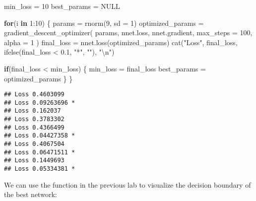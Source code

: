 \documentclass[
  a4paper,
]{article}
\newenvironment{Shaded}{\begin{snugshade}}{\end{snugshade}}
\newcommand{\AttributeTok}[1]{\textcolor[rgb]{0.77,0.63,0.00}{#1}}
\newcommand{\ConstantTok}[1]{\textcolor[rgb]{0.00,0.00,0.00}{#1}}
\newcommand{\ControlFlowTok}[1]{\textcolor[rgb]{0.13,0.29,0.53}{\textbf{#1}}}
\newcommand{\DecValTok}[1]{\textcolor[rgb]{0.00,0.00,0.81}{#1}}
\newcommand{\FloatTok}[1]{\textcolor[rgb]{0.00,0.00,0.81}{#1}}
\newcommand{\FunctionTok}[1]{\textcolor[rgb]{0.00,0.00,0.00}{#1}}
\newcommand{\NormalTok}[1]{#1}
\newcommand{\OtherTok}[1]{\textcolor[rgb]{0.56,0.35,0.01}{#1}}
\newcommand{\SpecialCharTok}[1]{\textcolor[rgb]{0.00,0.00,0.00}{#1}}
\newcommand{\StringTok}[1]{\textcolor[rgb]{0.31,0.60,0.02}{#1}}
\begin{document}
\begin{Shaded}
\begin{Highlighting}[]
\NormalTok{min\_loss }\OtherTok{=} \DecValTok{10}
\NormalTok{best\_params }\OtherTok{=} \ConstantTok{NULL}

\ControlFlowTok{for}\NormalTok{(i }\ControlFlowTok{in} \DecValTok{1}\SpecialCharTok{:}\DecValTok{10}\NormalTok{) \{}
\NormalTok{  params }\OtherTok{=} \FunctionTok{rnorm}\NormalTok{(}\DecValTok{9}\NormalTok{, }\AttributeTok{sd =} \DecValTok{1}\NormalTok{)}
\NormalTok{  optimized\_params }\OtherTok{=} \FunctionTok{gradient\_descent\_optimizer}\NormalTok{(}
\NormalTok{    params, nnet.loss, nnet.gradient, }\AttributeTok{max\_steps =} \DecValTok{100}\NormalTok{, }\AttributeTok{alpha =} \DecValTok{1}
\NormalTok{  )}
\NormalTok{  final\_loss }\OtherTok{=} \FunctionTok{nnet.loss}\NormalTok{(optimized\_params)}
  \FunctionTok{cat}\NormalTok{(}\StringTok{"Loss"}\NormalTok{, final\_loss, }\FunctionTok{ifelse}\NormalTok{(final\_loss }\SpecialCharTok{\textless{}} \FloatTok{0.1}\NormalTok{, }\StringTok{"*"}\NormalTok{, }\StringTok{""}\NormalTok{), }\StringTok{"}\SpecialCharTok{\textbackslash{}n}\StringTok{"}\NormalTok{)}
  
  \ControlFlowTok{if}\NormalTok{(final\_loss }\SpecialCharTok{\textless{}}\NormalTok{ min\_loss) \{}
\NormalTok{    min\_loss }\OtherTok{=}\NormalTok{ final\_loss}
\NormalTok{    best\_params }\OtherTok{=}\NormalTok{ optimized\_params}
\NormalTok{  \}}
\NormalTok{\}}
\end{Highlighting}
\end{Shaded}

\begin{verbatim}
## Loss 0.4603099  
## Loss 0.09263696 * 
## Loss 0.162037  
## Loss 0.3783302  
## Loss 0.4366499  
## Loss 0.04427358 * 
## Loss 0.4067504  
## Loss 0.06471511 * 
## Loss 0.1449693  
## Loss 0.05334381 *
\end{verbatim}

We can use the function in the previous lab to visualize the decision
boundary of the best network:
\end{document}
